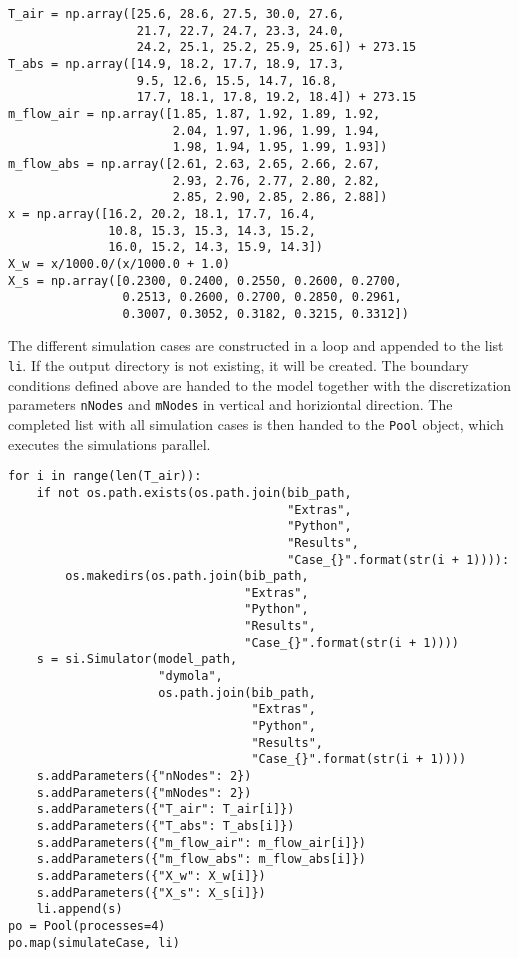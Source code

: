 \documentclass[article,a4paper,oneside,11pt,font=lmodern,language=english,titlepage=default,chapterstyle=article,pagestyle=default,bibliography=authoryear,theorem=colorbox,minted=true]{hri}
\begin{document}
\begin{verbatim}
T_air = np.array([25.6, 28.6, 27.5, 30.0, 27.6,
                  21.7, 22.7, 24.7, 23.3, 24.0,
                  24.2, 25.1, 25.2, 25.9, 25.6]) + 273.15
T_abs = np.array([14.9, 18.2, 17.7, 18.9, 17.3,
                  9.5, 12.6, 15.5, 14.7, 16.8,
                  17.7, 18.1, 17.8, 19.2, 18.4]) + 273.15
m_flow_air = np.array([1.85, 1.87, 1.92, 1.89, 1.92,
                       2.04, 1.97, 1.96, 1.99, 1.94,
                       1.98, 1.94, 1.95, 1.99, 1.93])
m_flow_abs = np.array([2.61, 2.63, 2.65, 2.66, 2.67,
                       2.93, 2.76, 2.77, 2.80, 2.82,
                       2.85, 2.90, 2.85, 2.86, 2.88])
x = np.array([16.2, 20.2, 18.1, 17.7, 16.4,
              10.8, 15.3, 15.3, 14.3, 15.2,
              16.0, 15.2, 14.3, 15.9, 14.3])
X_w = x/1000.0/(x/1000.0 + 1.0)
X_s = np.array([0.2300, 0.2400, 0.2550, 0.2600, 0.2700,
                0.2513, 0.2600, 0.2700, 0.2850, 0.2961,
                0.3007, 0.3052, 0.3182, 0.3215, 0.3312])
\end{verbatim}

\noindent The different simulation cases are constructed in a loop and appended
to the list \texttt{li}. If the output directory is not existing, it will be
created. The boundary conditions defined above are handed to the model together
with the discretization parameters \texttt{nNodes} and \texttt{mNodes} in vertical and
horiziontal direction. The completed list with all simulation cases is then
handed to the \texttt{Pool} object, which executes the simulations parallel.

\begin{verbatim}
for i in range(len(T_air)):
    if not os.path.exists(os.path.join(bib_path,
                                       "Extras",
                                       "Python",
                                       "Results",
                                       "Case_{}".format(str(i + 1)))):
        os.makedirs(os.path.join(bib_path,
                                 "Extras",
                                 "Python",
                                 "Results",
                                 "Case_{}".format(str(i + 1))))
    s = si.Simulator(model_path,
                     "dymola",
                     os.path.join(bib_path,
                                  "Extras",
                                  "Python",
                                  "Results",
                                  "Case_{}".format(str(i + 1))))
    s.addParameters({"nNodes": 2})
    s.addParameters({"mNodes": 2})
    s.addParameters({"T_air": T_air[i]})
    s.addParameters({"T_abs": T_abs[i]})
    s.addParameters({"m_flow_air": m_flow_air[i]})
    s.addParameters({"m_flow_abs": m_flow_abs[i]})
    s.addParameters({"X_w": X_w[i]})
    s.addParameters({"X_s": X_s[i]})
    li.append(s)
po = Pool(processes=4)
po.map(simulateCase, li)
\end{verbatim}
\end{document}
